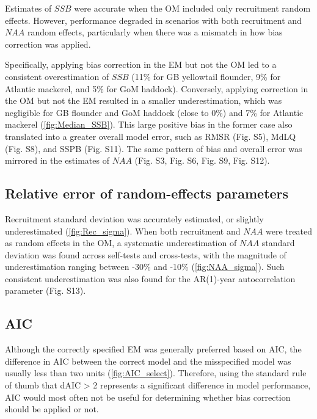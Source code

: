 \documentclass[
  12pt,
]{article}
\begin{document}
Estimates of \(SSB\) were accurate when the OM included only recruitment
random effects. However, performance degraded in scenarios with both
recruitment and \(NAA\) random effects, particularly when there was a
mismatch in how bias correction was applied.

Specifically, applying bias correction in the EM but not the OM led to a
consistent overestimation of \(SSB\) (11\% for GB yellowtail flounder,
9\% for Atlantic mackerel, and 5\% for GoM haddock). Conversely,
applying correction in the OM but not the EM resulted in a smaller
underestimation, which was negligible for GB flounder and GoM haddock
(close to 0\%) and 7\% for Atlantic mackerel (\autoref{fig:Median_SSB}).
This large positive bias in the former case also translated into a
greater overall model error, such as RMSR (Fig. S5), MdLQ (Fig. S8), and
SSPB (Fig. S11). The same pattern of bias and overall error was mirrored
in the estimates of \(NAA\) (Fig. S3, Fig. S6, Fig. S9, Fig. S12).

\hypertarget{relative-error-of-random-effects-parameters}{%
\subsection{Relative error of random-effects
parameters}\label{relative-error-of-random-effects-parameters}}

Recruitment standard deviation was accurately estimated, or slightly
underestimated (\autoref{fig:Rec_sigma}). When both recruitment and
\(NAA\) were treated as random effects in the OM, a systematic
underestimation of \(NAA\) standard deviation was found across
self-tests and cross-tests, with the magnitude of underestimation
ranging between -30\% and -10\% (\autoref{fig:NAA_sigma}). Such
consistent underestimation was also found for the AR(1)-year
autocorrelation parameter (Fig. S13).

\hypertarget{aic}{%
\subsection{AIC}\label{aic}}

Although the correctly specified EM was generally preferred based on
AIC, the difference in AIC between the correct model and the
misspecified model was usually less than two units
(\autoref{fig:AIC_select}). Therefore, using the standard rule of thumb
that dAIC \textgreater{} 2 represents a significant difference in model
performance, AIC would most often not be useful for determining whether
bias correction should be applied or not.
\end{document}
